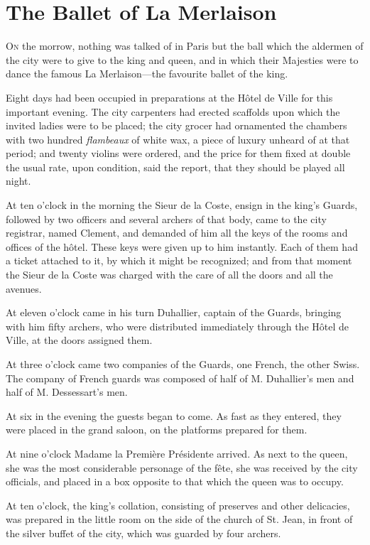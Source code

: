 
\chapter{The Ballet of La Merlaison}

\lettrine[]{O}{n} the morrow, nothing was talked of in Paris but the ball which the aldermen of the city were to give to the king and queen, and in which their Majesties were to dance the famous La Merlaison---the favourite ballet of the king. 

Eight days had been occupied in preparations at the Hôtel de Ville for this important evening. The city carpenters had erected scaffolds upon which the invited ladies were to be placed; the city grocer had ornamented the chambers with two hundred \textit{flambeaux} of white wax, a piece of luxury unheard of at that period; and twenty violins were ordered, and the price for them fixed at double the usual rate, upon condition, said the report, that they should be played all night. 

At ten o'clock in the morning the Sieur de la Coste, ensign in the king's Guards, followed by two officers and several archers of that body, came to the city registrar, named Clement, and demanded of him all the keys of the rooms and offices of the hôtel. These keys were given up to him instantly. Each of them had a ticket attached to it, by which it might be recognized; and from that moment the Sieur de la Coste was charged with the care of all the doors and all the avenues. 

At eleven o'clock came in his turn Duhallier, captain of the Guards, bringing with him fifty archers, who were distributed immediately through the Hôtel de Ville, at the doors assigned them. 

At three o'clock came two companies of the Guards, one French, the other Swiss. The company of French guards was composed of half of M. Duhallier's men and half of M. Dessessart's men. 

At six in the evening the guests began to come. As fast as they entered, they were placed in the grand saloon, on the platforms prepared for them. 

At nine o'clock Madame la Première Présidente arrived. As next to the queen, she was the most considerable personage of the fête, she was received by the city officials, and placed in a box opposite to that which the queen was to occupy. 

At ten o'clock, the king's collation, consisting of preserves and other delicacies, was prepared in the little room on the side of the church of St. Jean, in front of the silver buffet of the city, which was guarded by four archers. 

